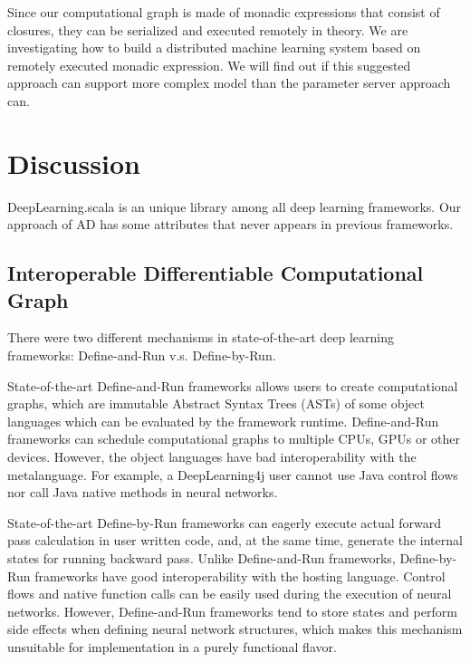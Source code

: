 Since our \gls{computational graph} is made of monadic expressions that consist of closures, they can be serialized and executed remotely in theory. We are investigating how to build a distributed machine learning system based on remotely executed monadic expression. We will find out if this suggested approach can support more complex model than the parameter server approach can.




\section{Discussion}

DeepLearning.scala is an unique library among all deep learning frameworks. Our approach of AD has some attributes that never appears in previous frameworks.

\subsection{Interoperable Differentiable Computational Graph}

There were two different mechanisms in state-of-the-art deep learning frameworks:
Define-and-Run v.s. Define-by-Run.

State-of-the-art Define-and-Run frameworks \cite{collobert2008torch,bergstra2010theano,jia2014caffe,chen2015mxnet,abadi2016tensorflow,intel2016bigdl,skymind2017deeplearning4j} allows users to create \glspl{computational graph}, which are immutable Abstract Syntax Trees (ASTs) of some object languages which can be evaluated by the framework runtime. Define-and-Run frameworks can schedule \glspl{computational graph} to multiple CPUs, GPUs or other devices. However, the object languages have bad interoperability with the metalanguage. For example, a DeepLearning4j user cannot use Java control flows nor call Java native methods in neural networks.

State-of-the-art Define-by-Run frameworks \cite{tokui2015chainer,neubig2017dynet,google2017eager,paszke2017pytorch} can eagerly execute actual forward pass calculation in user written code, and, at the same time, generate the internal states for running backward pass. Unlike Define-and-Run frameworks, Define-by-Run frameworks have good interoperability with the hosting language. Control flows and native function calls can be easily used during the execution of neural networks. However, Define-and-Run frameworks tend to store states and perform side effects when defining neural network structures, which makes this mechanism unsuitable for implementation in a purely functional flavor.

